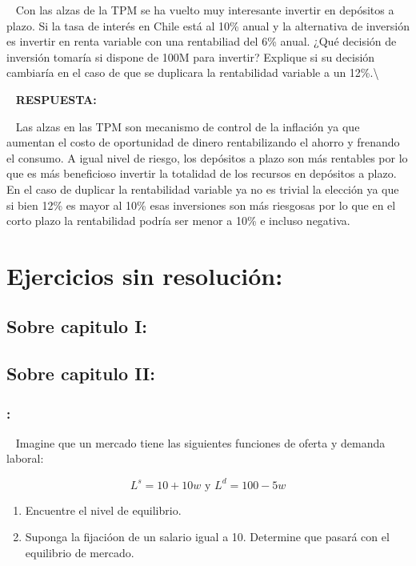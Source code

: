 \documentclass[
  letterpaper,
  DIV=11,
  numbers=noendperiod]{scrreport}
\begin{document}
~ Con las alzas de la TPM se ha vuelto muy interesante invertir en
depósitos a plazo. Si la tasa de interés en Chile está al 10\% anual y
la alternativa de inversión es invertir en renta variable con una
rentabiliad del 6\% anual. ¿Qué decisión de inversión tomaría si dispone
de 100M para invertir? Explique si su decisión cambiaría en el caso de
que se duplicara la rentabilidad variable a un 12\%.\textbackslash{}

~ \textbf{RESPUESTA:}

~ Las alzas en las TPM son mecanismo de control de la inflación ya que
aumentan el costo de oportunidad de dinero rentabilizando el ahorro y
frenando el consumo. A igual nivel de riesgo, los depósitos a plazo son
más rentables por lo que es más beneficioso invertir la totalidad de los
recursos en depósitos a plazo. En el caso de duplicar la rentabilidad
variable ya no es trivial la elección ya que si bien 12\% es mayor al
10\% esas inversiones son más riesgosas por lo que en el corto plazo la
rentabilidad podría ser menor a 10\% e incluso negativa.


\hypertarget{ejercicios-sin-resoluciuxf3n}{%
\chapter{Ejercicios sin
resolución:}\label{ejercicios-sin-resoluciuxf3n}}

\hypertarget{sobre-capitulo-i}{%
\section{Sobre capitulo I:}\label{sobre-capitulo-i}}

\hypertarget{sobre-capitulo-ii}{%
\section{Sobre capitulo II:}\label{sobre-capitulo-ii}}

\hypertarget{section-43}{%
\subsection{:}\label{section-43}}

~ Imagine que un mercado tiene las siguientes funciones de oferta y
demanda laboral:

\[L^s = 10 + 10w \text{ y } L^d = 100 - 5w\]

\begin{enumerate}
\def\labelenumi{\alph{enumi})}
\item
  Encuentre el nivel de equilibrio.
\item
  Suponga la fijacióon de un salario igual a 10. Determine que pasará
  con el equilibrio de mercado.
\end{enumerate}
\end{document}
